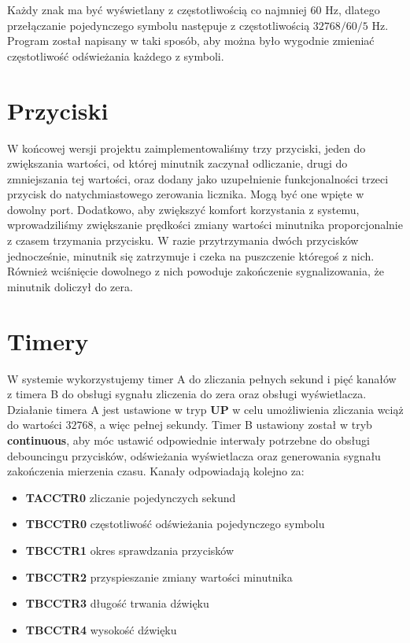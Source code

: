 \documentclass[fleqn]{article}
\begin{document}
Każdy znak ma być wyświetlany z częstotliwością co najmniej $60$ Hz, dlatego przełączanie pojedynczego symbolu następuje z częstotliwością $32768 / 60 / 5$ Hz. Program został napisany w taki sposób, aby można było wygodnie zmieniać częstotliwość odświeżania każdego z symboli.

\pagebreak

\section{Przyciski}

W końcowej wersji projektu zaimplementowaliśmy trzy przyciski, jeden do zwiększania wartości, od której minutnik zaczynał odliczanie, drugi do zmniejszania tej wartości, oraz dodany jako uzupełnienie funkcjonalności trzeci przycisk do natychmiastowego zerowania licznika. Mogą być one wpięte w dowolny port. Dodatkowo, aby zwiększyć komfort korzystania z systemu, wprowadziliśmy zwiększanie prędkości zmiany wartości minutnika proporcjonalnie z czasem trzymania przycisku. W razie przytrzymania dwóch przycisków jednocześnie, minutnik się zatrzymuje i czeka na puszczenie któregoś z nich. Również wciśnięcie dowolnego z nich powoduje zakończenie sygnalizowania, że minutnik doliczył do zera.

\section{Timery}

W systemie wykorzystujemy timer A do zliczania pełnych sekund i pięć kanałów z timera B do obsługi sygnału zliczenia do zera oraz obsługi wyświetlacza. Działanie timera A jest ustawione w tryp \textbf{UP} w celu umożliwienia zliczania wciąż do wartości $32768$, a więc pełnej sekundy. Timer B ustawiony został w tryb \textbf{continuous}, aby móc ustawić odpowiednie interwały potrzebne do obsługi debouncingu przycisków, odświeżania wyświetlacza oraz generowania sygnału zakończenia mierzenia czasu. Kanały odpowiadają kolejno za:
\begin{itemize}
	\item  \textbf{TACCTR0} zliczanie pojedynczych sekund
	\item  \textbf{TBCCTR0} częstotliwość odświeżania pojedynczego symbolu
	\item  \textbf{TBCCTR1} okres sprawdzania przycisków
	\item  \textbf{TBCCTR2} przyspieszanie zmiany wartości minutnika
	\item  \textbf{TBCCTR3} długość trwania dźwięku
	\item  \textbf{TBCCTR4} wysokość dźwięku
\end{itemize}
\end{document}
